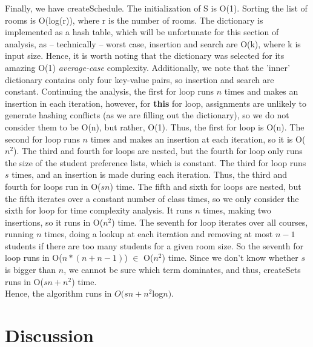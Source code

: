 \documentclass[11pt, oneside]{article}   	%
\begin{document}
 Finally, we have createSchedule. The initialization of S is O(1). Sorting the list of rooms is O(log(r)), where r is the number of rooms. The dictionary is implemented as a hash table, which will be unfortunate for this section of analysis, as – technically – worst case, insertion and search are O(k), where k is input size. Hence, it is worth noting that the dictionary was selected for its amazing O(1) \textit{average-case} complexity. Additionally, we note that the 'inner' dictionary contains only four key-value pairs, so insertion and search are constant. Continuing the analysis, the first for loop runs $n$ times and makes an insertion in each iteration, however, for \textbf{this} for loop, assignments are unlikely to generate hashing conflicts (as we are filling out the dictionary), so we do not consider them to be O(n), but rather, O(1). Thus, the first for loop is O(n). The second for loop runs $n$ times and makes an insertion at each iteration, so it is O($n^2$). The third and fourth for loops are nested, but the fourth for loop only runs the size of the student preference lists, which is constant. The third for loop runs $s$ times, and an insertion is made during each iteration. Thus, the third and fourth for loops run in O($sn$) time. The fifth and sixth for loops are nested, but the fifth iterates over a constant number of class times, so we only consider the sixth for loop for time complexity analysis. It runs $n$ times, making two insertions, so it runs in O($n^2$) time. The seventh for loop iterates over all courses, running $n$ times, doing a lookup at each iteration and removing at most $n-1$ students if there are too many students for a given room size. So the seventh for loop runs in O($n*(n+n-1)$) $\in$ O($n^2$) time. Since we don't know whether $s$ is bigger than $n$, we cannot be sure which term dominates, and thus, createSets runs in O($sn+n^2$) time. \\
 
 Hence, the algorithm runs in $O(sn + n^2$log$n)$. \\

\section{Discussion}
\end{document}
